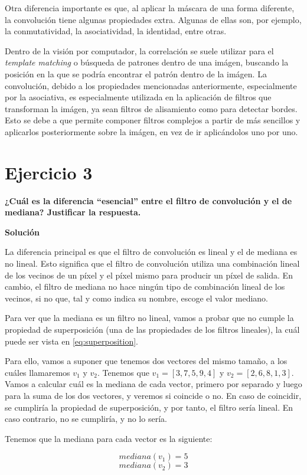 \documentclass[11pt,a4paper]{article}
\newcommand{\answer}{\noindent\textbf{Solución}}
\newcommand{\question}[1]{\noindent\textbf{#1}}
\newcommand{\nonumbersection}[1]{\section*{#1}\addcontentsline{toc}{section}{#1}}
\begin{document}
Otra diferencia importante es que, al aplicar la máscara de una forma diferente, la convolución tiene algunas propiedades
extra. Algunas de ellas son, por ejemplo, la conmutatividad, la asociatividad, la identidad, entre otras.

Dentro de la visión por computador, la correlación se suele utilizar para el \textit{template matching} o búsqueda de patrones
dentro de una imágen, buscando la posición en la que se podría encontrar el patrón dentro de la imágen. La convolución,
debido a los propiedades mencionadas anteriormente, especialmente por la asociativa, es especialmente
utilizada en la aplicación de filtros que transforman la imágen, ya sean filtros de alisamiento como para detectar bordes.
Esto se debe a que permite componer filtros complejos a partir de más sencillos y aplicarlos posteriormente sobre la imágen,
en vez de ir aplicándolos uno por uno.

\nonumbersection{Ejercicio 3}

\question{¿Cuál es la diferencia ``esencial'' entre el filtro de convolución y el de mediana? Justificar la respuesta.}

\answer

La diferencia principal es que el filtro de convolución es lineal y el de mediana es no lineal. Esto significa que el filtro
de convolución utiliza una combinación lineal de los vecinos de un píxel y el píxel mismo para producir un píxel de salida.
En cambio, el filtro de mediana no hace ningún tipo de combinación lineal de los vecinos, si no que, tal y como indica su
nombre, escoge el valor mediano.

Para ver que la mediana es un filtro no lineal, vamos a probar que no cumple la propiedad de superposición (una de las propiedades
de los filtros lineales), la cuál puede ser vista en \eqref{eq:superposition}.

Para ello, vamos a suponer que tenemos dos vectores del mismo tamaño, a los cuáles llamaremos $v_1$ y $v_2$. Tenemos que
$v_1 = [3, 7, 5, 9, 4]$ y $v_2 = [2, 6, 8, 1, 3]$. Vamos a calcular cuál es la mediana de cada vector, primero por
separado y luego para la suma de los dos vectores, y veremos si coincide o no. En caso de coincidir, se cumpliría la
propiedad de superposición, y por tanto, el filtro sería lineal. En caso contrario, no se cumpliría, y no lo sería.

Tenemos que la mediana para cada vector es la siguiente:

\[mediana(v_1) = 5 \]
\[mediana(v_2) = 3 \]
\end{document}
